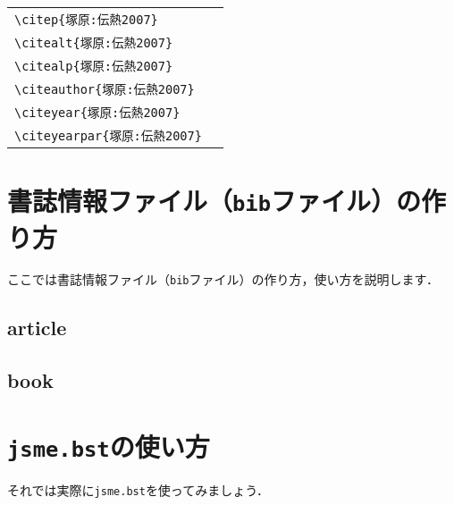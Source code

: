 \documentclass[a4paper,fleqn,12pt,uplatex]{jsarticle}
\begin{document}
\begin{table}[t]
\begin{tabular}{ll}
        \verb|\citep{塚原:伝熱2007}|            &\citep{塚原:伝熱2007} \\
        \verb|\citealt{塚原:伝熱2007}|          &\citealt{塚原:伝熱2007} \\
        \verb|\citealp{塚原:伝熱2007}|          &\citealp{塚原:伝熱2007} \\
        \verb|\citeauthor{塚原:伝熱2007}|       &\citeauthor{塚原:伝熱2007} \\
        \verb|\citeyear{塚原:伝熱2007}|         &\citeyear{塚原:伝熱2007} \\
        \verb|\citeyearpar{塚原:伝熱2007}|      &\citeyearpar{塚原:伝熱2007}
    \end{tabular}
\end{table}

\clearpage
\section{書誌情報ファイル（\texttt{bib}ファイル）の作り方}
\label{sec:bib}
ここでは書誌情報ファイル（\texttt{bib}ファイル）の作り方，使い方を説明します．


\subsection*{article}
\label{ssec:article}

\subsection*{book}
\label{ssec:book}


\section{\texttt{jsme.bst}の使い方}
それでは実際に\verb|jsme.bst|を使ってみましょう．

\clearpage
\nocite{*}



% 
\end{document}
